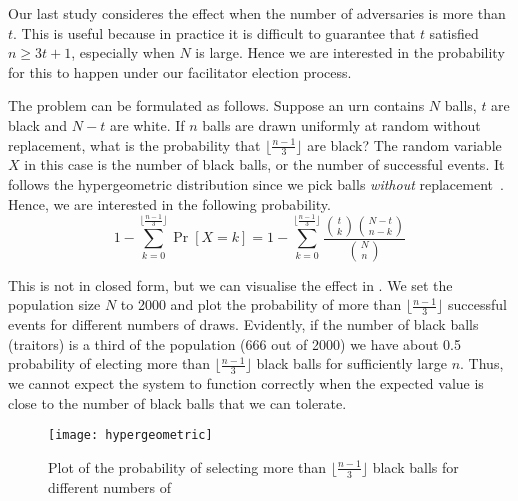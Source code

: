Our last study consideres the effect when the number of adversaries is more than $t$.
This is useful because in practice it is difficult to guarantee that $t$ satisfied $n \ge 3t + 1$, especially when $N$ is large.
Hence we are interested in the probability for this to happen under our facilitator election process.

The problem can be formulated as follows.
Suppose an urn contains $N$ balls, $t$ are black and $N-t$ are white.
If $n$ balls are drawn uniformly at random without replacement,
what is the probability that $\lfloor \frac{n-1}{3} \rfloor$ are black?
The random variable $X$ in this case is the number of black balls, or the number of successful events.
It follows the hypergeometric distribution since we pick balls \emph{without} replacement~\cite{skala2013hypergeometric}.
Hence, we are interested in the following probability.
$$
1 - \sum_{k = 0}^{\lfloor \frac{n-1}{3} \rfloor} \Pr[X = k] = 
1 - \sum_{k = 0}^{\lfloor \frac{n-1}{3} \rfloor} \frac{ \binom{t}{k} \binom{N-t}{n-k} }{ \binom{N}{n} }
$$

This is not in closed form,
but we can visualise the effect in .
We set the population size $N$ to 2000
and plot the probability of more than $\lfloor \frac{n-1}{3} \rfloor$ successful events for different numbers of draws.
Evidently,
if the number of black balls (traitors) is a third of the population (666 out of 2000)
we have about 0.5 probability of electing more than $\lfloor \frac{n-1}{3} \rfloor$ black balls for sufficiently large $n$.
Thus, we cannot expect the system to function correctly when 
the expected value is close to the number of black balls that we can tolerate.

\begin{figure}[h]
  \centering
  \texttt{[image: hypergeometric]}
  \caption{Plot of the probability of selecting more than $\lfloor \frac{n-1}{3} \rfloor$ black balls for
  different numbers of }
  \label{fig:hypergeometric}
\end{figure}

